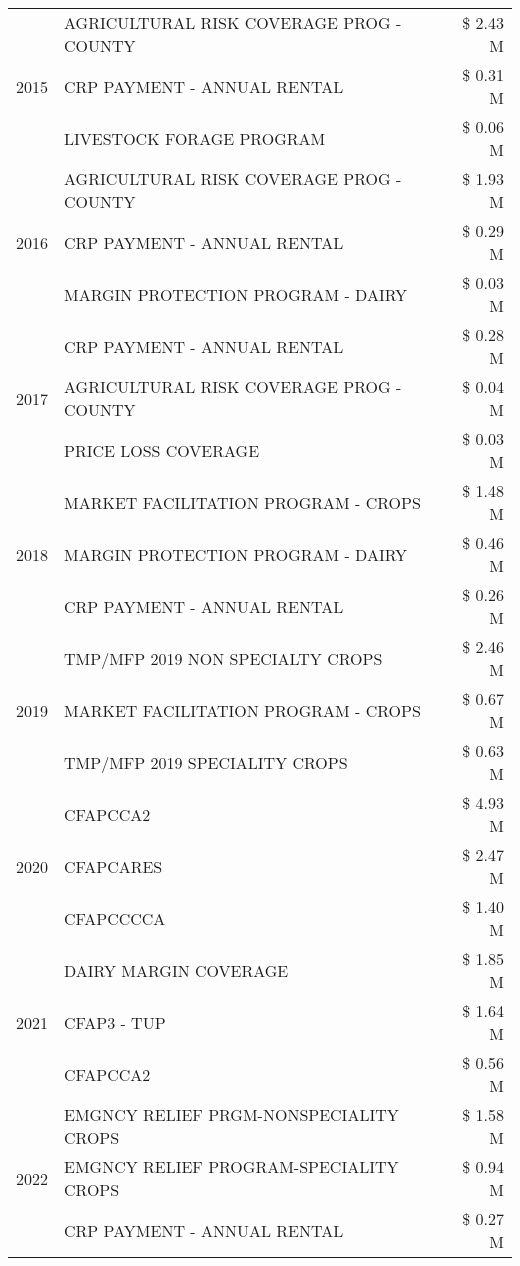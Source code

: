 \begin{tabular}{llr}
\cline{1-3}
\multirow[t]{3}{*}{2015} & AGRICULTURAL RISK COVERAGE PROG - COUNTY & \$ 2.43 M \\
 & CRP PAYMENT - ANNUAL RENTAL & \$ 0.31 M \\
 & LIVESTOCK FORAGE PROGRAM & \$ 0.06 M \\
\cline{1-3}
\multirow[t]{3}{*}{2016} & AGRICULTURAL RISK COVERAGE PROG - COUNTY & \$ 1.93 M \\
 & CRP PAYMENT - ANNUAL RENTAL & \$ 0.29 M \\
 & MARGIN PROTECTION PROGRAM - DAIRY & \$ 0.03 M \\
\cline{1-3}
\multirow[t]{3}{*}{2017} & CRP PAYMENT - ANNUAL RENTAL & \$ 0.28 M \\
 & AGRICULTURAL RISK COVERAGE PROG - COUNTY & \$ 0.04 M \\
 & PRICE LOSS COVERAGE & \$ 0.03 M \\
\cline{1-3}
\multirow[t]{3}{*}{2018} & MARKET FACILITATION PROGRAM - CROPS & \$ 1.48 M \\
 & MARGIN PROTECTION PROGRAM - DAIRY & \$ 0.46 M \\
 & CRP PAYMENT - ANNUAL RENTAL & \$ 0.26 M \\
\cline{1-3}
\multirow[t]{3}{*}{2019} & TMP/MFP 2019 NON SPECIALTY CROPS & \$ 2.46 M \\
 & MARKET FACILITATION PROGRAM - CROPS & \$ 0.67 M \\
 & TMP/MFP 2019 SPECIALITY CROPS & \$ 0.63 M \\
\cline{1-3}
\multirow[t]{3}{*}{2020} & CFAPCCA2 & \$ 4.93 M \\
 & CFAPCARES & \$ 2.47 M \\
 & CFAPCCCCA & \$ 1.40 M \\
\cline{1-3}
\multirow[t]{3}{*}{2021} & DAIRY MARGIN COVERAGE & \$ 1.85 M \\
 & CFAP3 - TUP & \$ 1.64 M \\
 & CFAPCCA2 & \$ 0.56 M \\
\cline{1-3}
\multirow[t]{3}{*}{2022} & EMGNCY RELIEF PRGM-NONSPECIALITY CROPS & \$ 1.58 M \\
 & EMGNCY RELIEF PROGRAM-SPECIALITY CROPS & \$ 0.94 M \\
 & CRP PAYMENT - ANNUAL RENTAL & \$ 0.27 M \\
\cline{1-3}
\bottomrule
\end{tabular}
